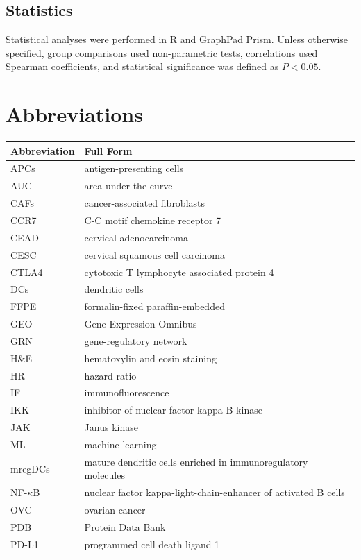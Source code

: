 \documentclass[pdflatex,sn-vancouver-num]{sn-jnl}
\begin{document}
\subsection{Statistics}
Statistical analyses were performed in R and GraphPad Prism. Unless otherwise specified, group comparisons used non-parametric tests, correlations used Spearman coefficients, and statistical significance was defined as $P<0.05$\cite{bib65,bib66,bib67}.



\section*{Abbreviations}
\begin{longtable}{p{3cm} p{9cm}}
\toprule
\textbf{Abbreviation} & \textbf{Full Form} \\
\midrule
APCs & antigen-presenting cells \\
AUC & area under the curve \\
CAFs & cancer-associated fibroblasts \\
CCR7 & C-C motif chemokine receptor 7 \\
CEAD & cervical adenocarcinoma \\
CESC & cervical squamous cell carcinoma \\
CTLA4 & cytotoxic T lymphocyte associated protein 4 \\
DCs & dendritic cells \\
FFPE & formalin-fixed paraffin-embedded \\
GEO & Gene Expression Omnibus \\
GRN & gene-regulatory network \\
H\&E & hematoxylin and eosin staining \\
HR & hazard ratio \\
IF & immunofluorescence \\
IKK & inhibitor of nuclear factor kappa-B kinase \\
JAK & Janus kinase \\
ML & machine learning \\
mregDCs & mature dendritic cells enriched in immunoregulatory molecules \\
NF-$\kappa$B & nuclear factor kappa-light-chain-enhancer of activated B cells \\
OVC & ovarian cancer \\
PDB & Protein Data Bank \\
PD-L1 & programmed cell death ligand 1 \\

\end{longtable}
\end{document}
